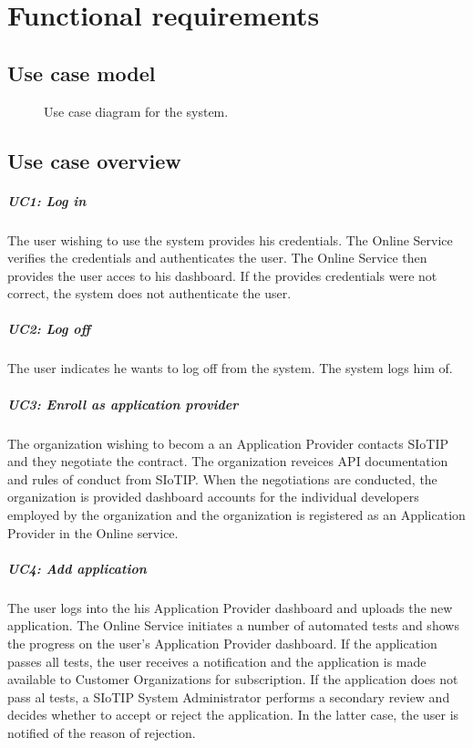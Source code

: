 \documentclass[english]{sareport}
\begin{document}
\chapter{Functional requirements}\label{sec:functional}
\section*{Use case model}

\begin{figure}[!htp]
    \centering
    \caption{Use case diagram for the system.}\label{fig:use_case_model}
\end{figure}

\section{Use case overview}\label{sec:uc_overview}
\paragraph{UC1: Log in}
The user wishing to use the system provides his credentials.
The Online Service verifies the credentials and authenticates the user.
The Online Service then provides the user acces to his dashboard.
If the provides credentials were not correct, the system does not authenticate the user.

\paragraph{UC2: Log off}
The user indicates he wants to log off from the system.
The system logs him of.

\paragraph{UC3: Enroll as application provider}
The organization wishing to becom a an Application Provider contacts SIoTIP and they negotiate the contract. The organization reveices API documentation and rules of conduct from SIoTIP. When the negotiations are conducted, the organization is provided dashboard accounts for the individual developers employed by the organization and the organization is registered as an Application Provider in the Online service.

\paragraph{UC4: Add application}
The user logs into the his Application Provider dashboard and uploads the new application. The Online Service initiates a number of automated tests and shows the progress on the user's Application Provider dashboard. If the application passes all tests, the user receives a notification and the application is made available to Customer Organizations for subscription. If the application does not pass al tests, a SIoTIP System Administrator performs a secondary review and decides whether to accept or reject the application. In the latter case, the user is notified of the reason of rejection.
\end{document}
